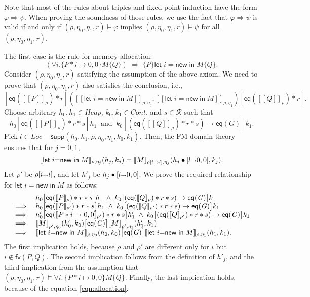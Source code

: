 \documentclass{LMCS}
\newcommand{\new}{\mathsf{new}}
\newcommand{\mletin}[2]{\mathsf{let}\;{#1}\;\mathsf{in}\;{#2}}
\newcommand{\pointsto}{\mapsto}
\newcommand{\Loc}{\mathit{Loc}}
\newcommand{\Heap}{\mathit{Heap}}
\newcommand{\Good}{\mathit{G}}
\newcommand{\cR}{\mathcal{R}}
\newcommand{\cont}{\mathit{Cont}}
\newcommand{\FV}{\mathsf{fv}}
\newcommand{\bind}{{\scriptstyle\relax\rightarrow}}
\newcommand{\supp}{\mathsf{supp}}
\newcommand{\ff}[1]{[\![#1]\!]}
\newcommand{\mtri}[3]{\{{#1}\}{#2}\{{#3}\}}
\newcommand{\squad}[4]{{[{#1}]}
                        ({#2},  {#3})
                       {[{#4}]}}
\newcommand{\EQ}{\mathsf{eq}}
\begin{document}
Note that most of the rules about triples and
fixed point induction have
the form $\varphi \Rightarrow \psi$. When proving
the soundness of those rules, we use
 the fact that  $\varphi \Rightarrow \psi$ is valid
if and only if $(\rho,\eta_0,\eta_1,r) \models \varphi$
implies $(\rho,\eta_0,\eta_1,r) \models \psi$
for all $(\rho,\eta_0,\eta_1,r)$. 


The first case is the rule for memory allocation:
$$
  (\forall i. \mtri{P*i\pointsto 0,0}{M}{Q})
  \;\Rightarrow\;
  \mtri{P}{\mletin{i{=}\new}{M}}{Q}.
$$
Consider $(\rho,\eta_0,\eta_1,r)$ satisfying the assumption
of the above axiom. We need to prove that 
$(\rho,\eta_0,\eta_1,r)$ also satisfies the conclusion, i.e.,
$$
   \squad
     {\EQ(\ff{P}_\rho)*r}
     {\ff{\mletin{i{=}\new}{M}}_{\rho,\eta_0}}
     {\ff{\mletin{i{=}\new}{M}}_{\rho,\eta_1}}
     {\EQ(\ff{Q}_\rho)*r}.
$$
Choose arbitrary $h_0,h_1 \in \Heap$, $k_0,k_1 \in \cont$,
and $s \in\cR$ such that 
$$
   h_0[\EQ(\ff{P}_\rho)*r*s]h_1
   \;\;\mbox{and}\;\;
   k_0[(\EQ(\ff{Q}_\rho)*r*s) \rightarrow \EQ(\Good)]k_1.
$$
Pick $l \in \Loc - \supp(h_0,h_1,\rho,\eta_0,\eta_1,k_0,k_1)$.
Then, the FM domain theory ensures that for $j=0,1$,
\begin{equation}\label{eqn:allocation}
  {\ff{\mletin{i{=}\new}{M}}_{\rho,\eta_j}}(h_j,k_j) 
  = 
  {\ff{M}_{\rho[i\bind l],\eta_j}}(h_j\bullet [l\bind 0,0],k_j).
\end{equation}
Let $\rho'$ be $\rho[i \bind l]$, and let $h'_j$ be 
$h_j\bullet [l\bind 0,0]$. We prove the required
relationship for $\mletin{i{=}\new}{M}$ as follows:
$$
\begin{array}{@{}ll@{}}
&
   h_0\bigl[\EQ(\ff{P}_\rho)*r*s\bigr]h_1\;\wedge\;
   k_0\bigl[(\EQ(\ff{Q}_\rho)*r*s) \rightarrow \EQ(\Good)\bigr]k_1
\\
\implies 
&
   h_0\bigl[\EQ(\ff{P}_{\rho'})*r*s\bigr]h_1
   \;\wedge\;
   k_0\bigl[(\EQ(\ff{Q}_{\rho'})*r*s) \rightarrow \EQ(\Good)\bigr]k_1
\\
\implies 
&
   h'_0\bigl[\EQ(\ff{P*i\pointsto 0,0}_{\rho'})*r*s\bigr]h'_1
   \;\wedge\;
   k_0\bigl[(\EQ(\ff{Q}_{\rho'})*r*s) \rightarrow \EQ(\Good)\bigr]k_1
\\
\implies 
&
  {\ff{M}}_{\rho',\eta_0}(h'_0,k_0) 
  \bigl[\EQ(\Good)\bigr]
  {\ff{M}}_{\rho',\eta_1}(h'_1,k_1)
\\
\implies
&
  {\ff{\mletin{i{=}\new}{M}}_{\rho,\eta_0}}(h_0,k_0) 
  \bigl[\EQ(\Good)\bigr]
  {\ff{\mletin{i{=}\new}{M}}_{\rho,\eta_1}}(h_1,k_1).
\end{array}
$$
The first implication holds, because 
$\rho$ and $\rho'$ are different only 
for $i$ but $i \not\in \FV(P,Q)$.
The second implication follows from the definition of $h'_j$,
and the third implication from the assumption that
$(\rho,\eta_0,\eta_1,r) 
     \models \forall i.\,\mtri{P*i\pointsto 0,0}{M}{Q}$.
Finally, the last implication holds, because
of the equation \ref{eqn:allocation}.
\end{document}
